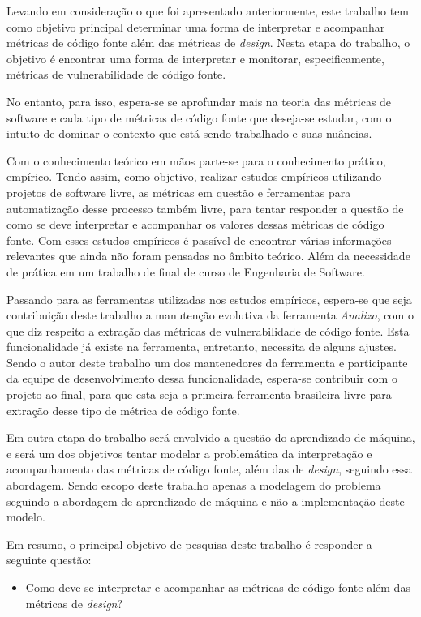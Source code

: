 Levando em consideração o que foi apresentado anteriormente, este trabalho tem
como objetivo principal determinar uma forma de interpretar e acompanhar
métricas de código fonte além das métricas de \textit{design}. Nesta
etapa do trabalho, o objetivo é encontrar uma forma de interpretar e monitorar,
especificamente, métricas de vulnerabilidade de código fonte.

No entanto, para isso, espera-se se aprofundar mais na teoria das métricas de
software e cada tipo de métricas de código fonte que deseja-se estudar, com o 
intuito de dominar o contexto que está sendo trabalhado e suas nuâncias.

Com o conhecimento teórico em mãos parte-se para o conhecimento prático,
empírico. Tendo assim, como objetivo, realizar estudos empíricos utilizando 
projetos de software livre, as métricas em questão e ferramentas para 
automatização desse processo também livre, para tentar responder a questão de 
como se deve interpretar e acompanhar os valores dessas métricas de código fonte.
Com esses estudos empíricos é passível de encontrar várias informações relevantes
que ainda não foram pensadas no âmbito teórico. Além da necessidade de prática
em um trabalho de final de curso de Engenharia de Software.

Passando para as ferramentas utilizadas nos estudos empíricos, espera-se que
seja contribuição deste trabalho a manutenção evolutiva da ferramenta
\emph{Analizo}, com o que diz respeito a extração das métricas de
vulnerabilidade de código fonte. Esta funcionalidade já existe na ferramenta,
entretanto, necessita de alguns ajustes. Sendo o autor deste trabalho um dos
mantenedores da ferramenta e participante da equipe de desenvolvimento dessa
funcionalidade, espera-se contribuir com o projeto ao final, para que esta seja
a primeira ferramenta brasileira livre para extração desse tipo de métrica de 
código fonte.

Em outra etapa do trabalho será envolvido a questão do aprendizado de máquina, e
será um dos objetivos tentar modelar a problemática da interpretação e
acompanhamento das métricas de código fonte, além das de \textit{design},
seguindo essa abordagem. Sendo escopo deste trabalho apenas a modelagem do
problema seguindo a abordagem de aprendizado de máquina e não a implementação
deste modelo.

Em resumo, o principal objetivo de pesquisa deste trabalho é responder a
seguinte questão:

\begin{itemize}
  \item Como deve-se interpretar e acompanhar as métricas de código fonte além 
    das métricas de \textit{design}?
\end{itemize}


